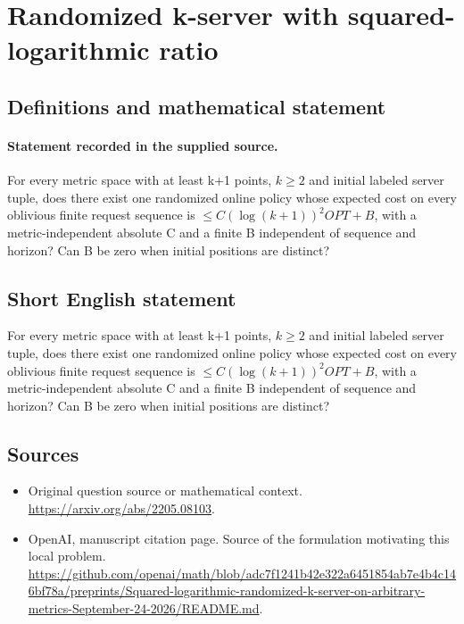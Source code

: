 \documentclass[11pt]{article}
\begin{document}
\section*{Randomized k-server with squared-logarithmic ratio}\label{30007481}
\subsection{Definitions and mathematical statement}
\paragraph{Statement recorded in the supplied source.}
For every metric space with at least k+1 points, $k\geq 2$ and initial labeled server tuple, does there exist one randomized online policy whose expected cost on every oblivious finite request sequence is $\leq C(\log (k+1))^{2}OPT+B$, with a metric-independent absolute C and a finite B independent of sequence and horizon? Can B be zero when initial positions are distinct?
\subsection{Short English statement}
For every metric space with at least k+1 points, $k\geq 2$ and initial labeled server tuple, does there exist one randomized online policy whose expected cost on every oblivious finite request sequence is $\leq C(\log (k+1))^{2}OPT+B$, with a metric-independent absolute C and a finite B independent of sequence and horizon? Can B be zero when initial positions are distinct?
\subsection{Sources}
\begin{itemize}
\item[S1] Original question source or mathematical context.
\url{https://arxiv.org/abs/2205.08103}.
\item[S2] OpenAI, manuscript citation page. Source of the formulation motivating this local problem.
\url{https://github.com/openai/math/blob/adc7f1241b42e322a6451854ab7e4b4c146bf78a/preprints/Squared-logarithmic-randomized-k-server-on-arbitrary-metrics-September-24-2026/README.md}.
\end{itemize}
\end{document}
